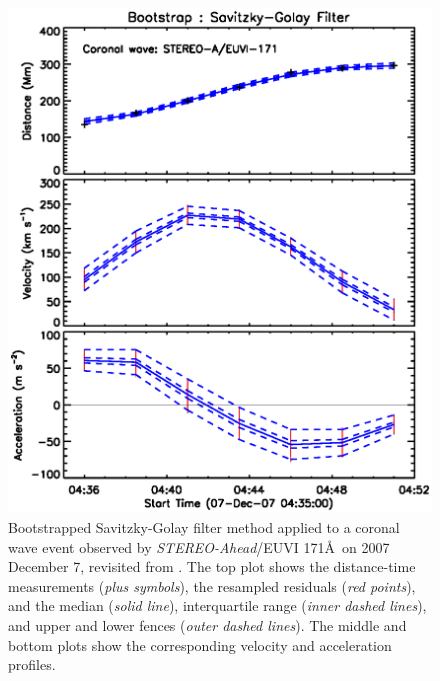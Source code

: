 \documentclass[structabstract]{aa}
\begin{document}
\begin{figure}
\centering
\includegraphics[scale=0.6, trim=0 40 0 30]{images/fit_kinscasestudy_wave20071207.eps}
\caption{Bootstrapped Savitzky-Golay filter method applied to a coronal wave event observed by \emph{STEREO-Ahead}/EUVI 171\AA\ on 2007 December 7, revisited from \citet{2011A&A...531A..42L}. The top plot shows the distance-time measurements (\emph{plus symbols}), the resampled residuals (\emph{red points}), and the median (\emph{solid line}), interquartile range (\emph{inner dashed lines}), and upper and lower fences (\emph{outer dashed lines}). The middle and bottom plots show the corresponding velocity and acceleration profiles.}
\label{fig_savgol_wave}
\end{figure}
\end{document}
